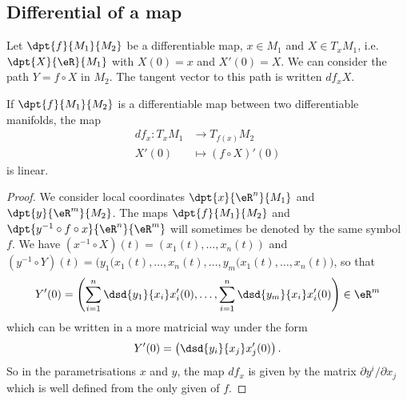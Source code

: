 \subsection{Differential of a map}

Let $\dpt{f}{M_1}{M_2}$ be a differentiable map, $x\in M_1$ and $X\in T_xM_1$, i.e. $\dpt{X}{\eR}{M_1}$ with $X(0)=x$ and $X'(0)=X$. We can consider the path $Y=f\circ X$ in $M_2$. The tangent vector to this path is written $df_x X$.

\begin{proposition}
	If $\dpt{f}{M_1}{M_2}$ is a differentiable map between two differentiable manifolds, the map
	\begin{equation}
		\begin{aligned}
			df_x \colon T_xM_1 & \to T_{f(x)}M_2        \\
			X'(0)              & \mapsto (f\circ X)'(0)
		\end{aligned}
	\end{equation}
	is linear.
\end{proposition}

\begin{proof}
	We consider local coordinates $\dpt{x}{\eR^n}{M_1}$ and $\dpt{y}{\eR^m}{M_2}$. The maps $\dpt{f}{M_1}{M_2}$ and $\dpt{y^{-1}\circ f\circ x}{\eR^n}{\eR^m}$ will sometimes be denoted by the same symbol $f$. We have $(x^{-1}\circ X)(t)=(x_1(t),\ldots,x_n(t))$ and $(y^{-1}\circ Y)(t)=\big( y_1(x_1(t),\ldots,x_n(t),\ldots, y_m(x_1(t),\ldots,x_n(t)  \big)$, so that
	\[
		Y'(0)=\left(   \sum_{i=1}^n \dsd{y_1}{x_i}x_i'(0),\ldots,\sum_{i=1}^n \dsd{y_m}{x_i}x_i'(0)   \right)\in\eR^m
	\]
	which can be written in a more matricial way under the form
	\[
		Y'(0)=\left( \dsd{y_i}{x_j}x'_j(0) \right).
	\]
	So in the parametrisations $x$ and $y$, the map $df_x$ is given by the matrix $\partial y^i/\partial x_j$ which is well defined from the only given of $f$.
\end{proof}


